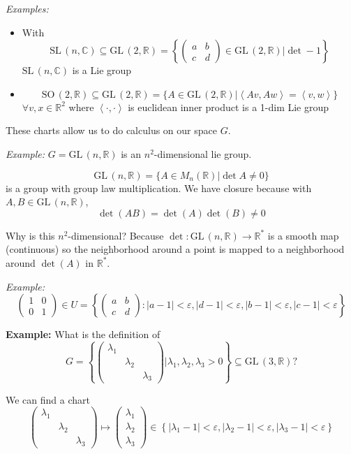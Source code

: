\documentclass[12pt]{article}
\newcommand{\R}{\mathbb{R}}
\newcommand{\C}{\mathbb{C}}
\newcommand{\brak}[1]{\left\langle #1 \right\rangle}
\newcommand{\abs}[1]{\left\vert #1 \right\vert}
\newcommand{\SL}{\text{SL}\,}
\newcommand{\SO}{\text{SO}\,}
\newcommand{\GL}{\text{GL}\,}
\begin{document}
    \emph{Examples:}
    \begin{itemize}
        \item With 
        \[\SL(n, \C) \subseteq \GL(2, \R) = \left\{\begin{pmatrix}
            a & b\\ 
            c & d
        \end{pmatrix} \in \GL(2, \R) \bigg\vert \det -1\right\}\] 
        $\SL(n, \C)$ is a Lie group 

        \item 
        \[\SO(2, \R) \subseteq \GL(2, \R) = \{A \in \GL(2, \R) \big\vert \brak{Av, Aw} = \brak{v, w}\}\] $\forall v, x \in \R^2$ where $\brak{\cdot, \cdot}$ is euclidean inner product is a 1-dim Lie group 
    \end{itemize}

    These charts allow us to do calculus on our space $G$. 

    \emph{Example:} $G = \GL(n, \R)$ is an $n^2$-dimensional lie group. 
    
    \[\GL(n, \R) = \{A \in M_n(\R) \big\vert \det A \neq 0\}\]
    is a group with group law multiplication. We have closure because with $A, B \in \GL(n, \R)$, 
    \[\det(AB) = \det(A) \det(B) \neq 0\] 
    
    Why is this $n^2$-dimensional? Because $\det: \GL(n, \R) \to \R^*$ is a smooth map (continuous) so the neighborhood around a point is mapped to a neighborhood around $\det(A)$ in $\R^*$. 

    \emph{Example:} 
    \[\begin{pmatrix}
        1 & 0\\ 
        0 & 1
    \end{pmatrix} \in U = \left\{\begin{pmatrix}
        a & b\\ 
        c & d
    \end{pmatrix}: \abs{a - 1} < \varepsilon, \abs{d - 1} < \varepsilon, \abs{b - 1} < \varepsilon, \abs{c - 1} < \varepsilon\right\}\]

    \textbf{Example:} What is the definition of 
    \[G = \left\{\begin{pmatrix}
        \lambda_1\\ 
        & \lambda_2\\
        & & \lambda_3
    \end{pmatrix} \bigg\vert \lambda_1, \lambda_2, \lambda_3 > 0\right\} \subseteq \GL(3, \R)?\] 

    We can find a chart 
    \[\begin{pmatrix}
        \lambda_1\\ 
        & \lambda_2\\
        & & \lambda_3
    \end{pmatrix} \mapsto \begin{pmatrix}
        \lambda_1\\ 
        \lambda_2\\
        \lambda_3
    \end{pmatrix} \in \left\{\abs{\lambda_1 - 1} < \varepsilon, \abs{\lambda_2 - 1} < \varepsilon, \abs{\lambda_3 - 1} < \varepsilon\right\}\]
\end{document}
